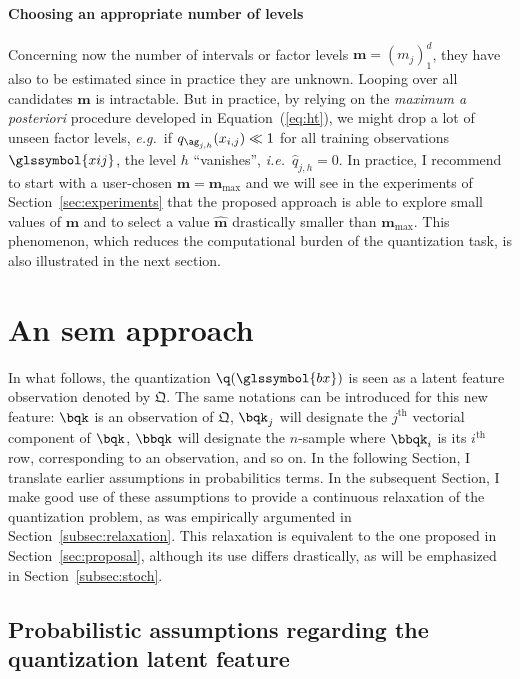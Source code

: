 \paragraph{Choosing an appropriate number of levels}

Concerning now the number of intervals or factor levels $\boldsymbol{m} = (m_j)_1^d$, they have also to be estimated since in practice they are unknown. Looping over all candidates $\boldsymbol{m}$ is intractable. But in practice, by relying on the \textit{maximum a posteriori} procedure developed in Equation~(\ref{eq:ht}), we might drop a lot of unseen factor levels, \textit{e.g.}\ if $q_{\ag_{j,h}}(x_{i,j}) \ll 1$ for all training observations $\glssymbol{xij}$, the level $h$ ``vanishes'', \textit{i.e.}\ $\hat{q}_{j,h} = 0$. In practice, I recommend to start with a user-chosen $\bm{m}=\boldsymbol{m}_{\max}$ and we will see in the experiments of Section~\ref{sec:experiments} that the proposed approach is able to explore small values of $\boldsymbol{m}$ and to select a value $\hat{\boldsymbol{m}}$ drastically smaller than $\boldsymbol{m}_{\max}$. This phenomenon, which reduces the computational burden of the quantization task, is also illustrated in the next section.




\section{An \gls{sem} approach} \label{sec:sem}
 
 
In what follows, the quantization $\q(\glssymbol{bx})$ is seen as a latent feature observation denoted by $\bm{\mathfrak{Q}}$. The same notations can be introduced for this new feature:  $\bqk$ is an observation of $\bm{\mathfrak{Q}}$, $\bqk_j$ will designate the $j^{\text{th}}$ vectorial component of $\bqk$, $\bbqk$ will designate the $n$-sample where $\bbqk_i$ is its $i^{\text{th}}$ row, corresponding to an observation, and so on. In the following Section, I translate earlier assumptions in probabilitics terms. In the subsequent Section, I make good use of these assumptions to provide a continuous relaxation of the quantization problem, as was empirically argumented in Section~\ref{subsec:relaxation}. This relaxation is equivalent to the one proposed in Section~\ref{sec:proposal}, although its use differs drastically, as will be emphasized in Section~\ref{subsec:stoch}.

\subsection{Probabilistic assumptions regarding the quantization latent feature}

